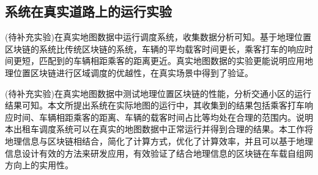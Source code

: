 \subsection{系统在真实道路上的运行实验}
(待补充实验)在真实地图数据中运行调度系统，收集数据分析可知。基于地理位置区块链的系统比传统区块链的系统，车辆的平均载客时间更长，乘客打车的响应时间更短，匹配到的车辆相距乘客的距离更近。真实地图数据的实验更能说明应用地理位置区块链进行区域调度的优越性，在真实场景中得到了验证。


(待补充实验)在真实地图数据中测试地理位置区块链的性能，分析交通小区的运行结果可知。本文所提出系统在实际地图的运行中，其收集到的结果包括乘客打车响应时间、车辆相距乘客的距离、车辆的载客时间占比等均处在合理的范围内。说明本出租车调度系统可以在真实的地图数据中正常运行并得到合理的结果。本工作将地理信息与区块链相结合，简化了计算方式，优化了计算效率，并且可以基于地理信息设计有效的方法来研发应用，有效验证了结合地理信息的区块链在车载自组网方向上的实用性。








